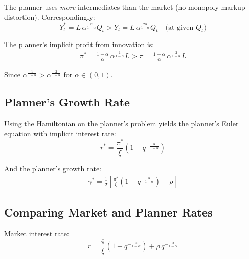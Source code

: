 \documentclass[a4paper,11pt]{article}
\newcommand{\pibar}{\overline{\pi}}
\begin{document}
The planner uses \emph{more} intermediates than the market (no monopoly markup distortion). Correspondingly:
\[
Y_t^* = L\,\alpha^{\frac{\alpha}{1-\alpha}} Q_t > Y_t = L\,\alpha^{\frac{2\alpha}{1-\alpha}} Q_t \quad \text{(at given } Q_t\text{)}
\]

The planner's implicit profit from innovation is:
\begin{align*}
\pi^* = \frac{1-\alpha}{\alpha}\,\alpha^{\frac{1}{1-\alpha}} L > \pibar = \frac{1-\alpha}{\alpha}\,\alpha^{\frac{2}{1-\alpha}} L
\tag{Planner Profit}
\end{align*}

Since $\alpha^{\frac{1}{1-\alpha}} > \alpha^{\frac{2}{1-\alpha}}$ for $\alpha \in (0,1)$.

\subsection*{Planner's Growth Rate}

Using the Hamiltonian on the planner's problem yields the planner's Euler equation with implicit interest rate:
\[
r^* = \frac{\pi^*}{\xi}\left(1 - q^{-\frac{\alpha}{1-\alpha}}\right)
\]

And the planner's growth rate:
\begin{align*}
\gamma^* = \frac{1}{\sigma}\left[\frac{\pi^*}{\xi}\left(1 - q^{-\frac{\alpha}{1-\alpha}}\right) - \rho\right]
\tag{Planner Growth}
\end{align*}

\subsection*{Comparing Market and Planner Rates}

Market interest rate:
\[
r = \frac{\pibar}{\xi}\left(1 - q^{-\frac{\alpha}{1-\alpha}}\right) + \rho\, q^{-\frac{\alpha}{1-\alpha}}
\]
\end{document}
